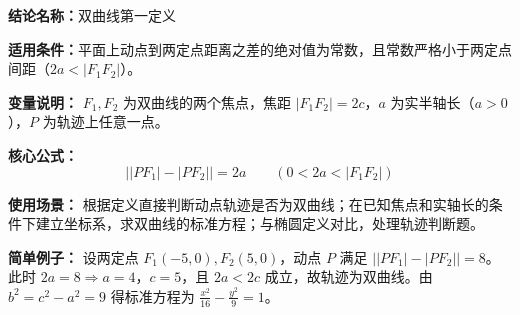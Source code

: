 \textbf{结论名称：}双曲线第一定义

\textbf{适用条件：}平面上动点到两定点距离之差的绝对值为常数，且常数严格小于两定点间距（\(2a<|F_1F_2|\)）。

\textbf{变量说明：} \(F_1,F_2\) 为双曲线的两个焦点，焦距 \(|F_1F_2|=2c\)，\(a\) 为实半轴长（\(a>0\)），\(P\) 为轨迹上任意一点。

\textbf{核心公式：}
\[
\boxed{\bigl||PF_1|-|PF_2|\bigr|=2a\qquad (0<2a<|F_1F_2|)}
\]

\textbf{使用场景：} 根据定义直接判断动点轨迹是否为双曲线；在已知焦点和实轴长的条件下建立坐标系，求双曲线的标准方程；与椭圆定义对比，处理轨迹判断题。

\textbf{简单例子：} 设两定点 \(F_1(-5,0),F_2(5,0)\)，动点 \(P\) 满足 \(\bigl||PF_1|-|PF_2|\bigr|=8\)。此时 \(2a=8\Rightarrow a=4\)，\(c=5\)，且 \(2a<2c\) 成立，故轨迹为双曲线。由 \(b^2=c^2-a^2=9\) 得标准方程为 \(\frac{x^2}{16}-\frac{y^2}{9}=1\)。